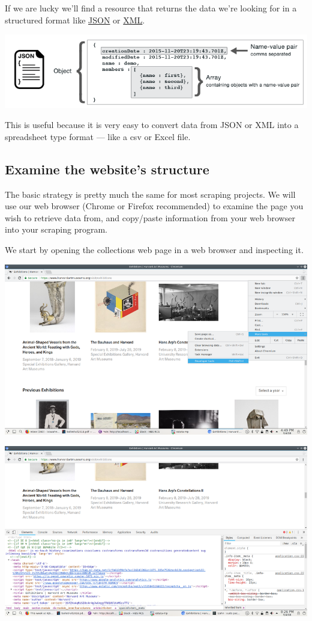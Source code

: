 \documentclass[
]{book}
\begin{document}
If we are lucky we'll find a resource that returns the data we're looking for in a structured format like \href{https://json.org/}{JSON} or \href{https://en.wikipedia.org/wiki/XML}{XML}.

\includegraphics{Python/PythonWebScrape/images/json-format.png}

This is useful because it is very easy to convert data from JSON or XML into a spreadsheet type format --- like a csv or Excel file.

\hypertarget{examine-the-websites-structure}{%
\subsection{Examine the website's structure}\label{examine-the-websites-structure}}

The basic strategy is pretty much the same for most scraping projects. We will use our web browser (Chrome or Firefox recommended) to examine the page you wish to retrieve data from, and copy/paste information from your web browser into your scraping program.

We start by opening the collections web page in a web browser and inspecting it.

\includegraphics{Python/PythonWebScrape/images/dev_tools.png}

\includegraphics{Python/PythonWebScrape/images/dev_tools_pane.png}
\end{document}
